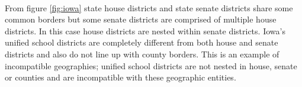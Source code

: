 \documentclass{article}\usepackage[]{graphicx}\usepackage[]{color}
\newenvironment{knitrout}{}{} %
\begin{document}
\\
From figure \ref{fig:iowa} state house districts and state senate districts share some common borders but some senate districts are comprised of multiple house districts.  In this case house districts are nested within senate districts.  Iowa's unified school districts are completely different from both house and senate districts and also do not line up with county borders.  This is an example of incompatible geographies; unified school districts are not nested in house, senate or counties and are incompatible with these geographic entities.\\

\begin{knitrout}
\color{fgcolor}\begin{figure}[]



\end{figure}
\end{knitrout}
\end{document}
